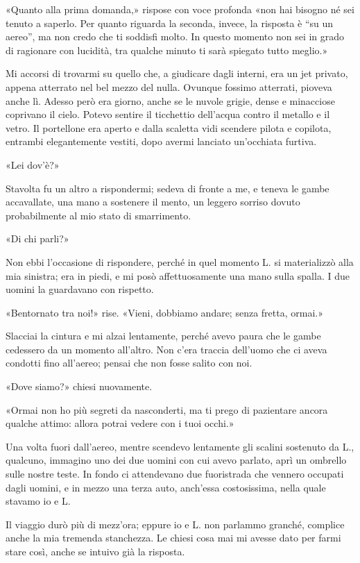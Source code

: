 \documentclass[a4paper,12pt]{book}
\begin{document}
«Quanto alla prima domanda,» rispose con voce profonda «non hai bisogno né
sei tenuto a saperlo. Per quanto riguarda la seconda, invece, la risposta è
``su un aereo'', ma non credo che ti soddisfi molto. In questo momento non sei
in grado di ragionare con lucidità, tra qualche minuto ti sarà spiegato tutto
meglio.»

Mi accorsi di trovarmi su quello che, a giudicare dagli interni, era un jet
privato, appena atterrato nel bel mezzo del nulla. Ovunque fossimo atterrati,
pioveva anche lì. Adesso però era giorno, anche se le nuvole grigie, dense e
minacciose coprivano il cielo. Potevo sentire il ticchettio dell’acqua contro
il metallo e il vetro. Il portellone era aperto e dalla scaletta vidi scendere
pilota e copilota, entrambi elegantemente vestiti, dopo avermi lanciato
un’occhiata furtiva.

«Lei dov’è?»

Stavolta fu un altro a rispondermi; sedeva di fronte a me, e teneva le gambe
accavallate, una mano a sostenere il mento, un leggero sorriso dovuto
probabilmente al mio stato di smarrimento.

«Di chi parli?»

Non ebbi l’occasione di rispondere, perché in quel momento L. si
materializzò alla mia sinistra; era in piedi, e mi posò affettuosamente una
mano sulla spalla. I due uomini la guardavano con rispetto.

«Bentornato tra noi!» rise. «Vieni, dobbiamo andare; senza fretta, ormai.»

Slacciai la cintura e mi alzai lentamente, perché avevo paura che le gambe
cedessero da un momento all’altro. Non c’era traccia dell’uomo che ci
aveva condotti fino all’aereo; pensai che non fosse salito con noi.

«Dove siamo?» chiesi nuovamente.

«Ormai non ho più segreti da nasconderti, ma ti prego di pazientare ancora
qualche attimo: allora potrai vedere con i tuoi occhi.»

Una volta fuori dall’aereo, mentre scendevo lentamente gli scalini sostenuto
da L., qualcuno, immagino uno dei due uomini con cui avevo parlato, aprì un
ombrello sulle nostre teste. In fondo ci attendevano due fuoristrada che vennero
occupati dagli uomini, e in mezzo una terza auto, anch’essa costosissima,
nella quale stavamo io e L.

Il viaggio durò più di mezz’ora; eppure io e L. non parlammo granché,
complice anche la mia tremenda stanchezza. Le chiesi cosa mai mi avesse dato per
farmi stare così, anche se intuivo già la risposta.
\end{document}
